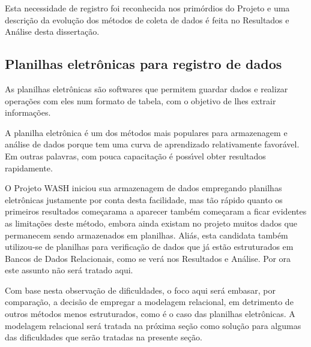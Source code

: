 \documentclass[
12pt,		%
openright,	%
twoside,  %
a4paper,			%
chapter=TITLE,		%
english,			%
french,				%
spanish,			%
brazil				%
]{USPSC-classe/USPSC_RedarTex}
\begin{document}
Esta necessidade de registro foi reconhecida nos prim\'ordios do Projeto e uma descri\c{c}\~ao da evolu\c{c}\~ao dos m\'etodos de coleta de dados \'e feita no Resultados e An\'alise desta disserta\c{c}\~ao.










\subsection[Planilhas eletr\^onicas para registro de dados]{Planilhas eletr\^onicas para registro de dados}\label{Planilhas eletr\^onicas para registro de dados}
As planilhas eletr\^onicas s\~ao softwares que permitem guardar  dados e realizar opera\c{c}\~oes com eles num formato de tabela, com o objetivo de lhes extrair informa\c{c}\~oes.










A planilha eletr\^onica \'e um dos m\'etodos mais populares para armazenagem e an\'alise de dados porque tem uma curva de aprendizado relativamente favor\'avel. Em outras palavras, com pouca capacita\c{c}\~ao \'e poss\'{\i}vel obter resultados rapidamente.










O Projeto WASH iniciou sua armazenagem de dados empregando planilhas eletr\^onicas justamente por conta desta facilidade, mas t\~ao r\'apido quanto os primeiros resultados come\c{c}arama a aparecer tamb\'em come\c{c}aram a ficar evidentes as limita\c{c}\~oes deste m\'etodo, embora ainda existam no projeto muitos dados que permanecem sendo armazenados em planilhas. Ali\'as, esta candidata tamb\'em utilizou-se de planilhas para verifica\c{c}\~ao de dados que j\'a est\~ao estruturados em Bancos de Dados Relacionais, como se ver\'a nos Resultados e An\'alise. Por ora este assunto n\~ao ser\'a tratado aqui.










Com base nesta observa\c{c}\~ao de dificuldades, o foco aqui ser\'a embasar, por compara\c{c}\~ao, a decis\~ao de empregar a modelagem relacional, em detrimento de outros m\'etodos menos estruturados, como \'e o caso das planilhas eletr\^onicas. A modelagem relacional ser\'a tratada na pr\'oxima se\c{c}\~ao como solu\c{c}\~ao para algumas das dificuldades que ser\~ao tratadas na presente se\c{c}\~ao.
\end{document}

